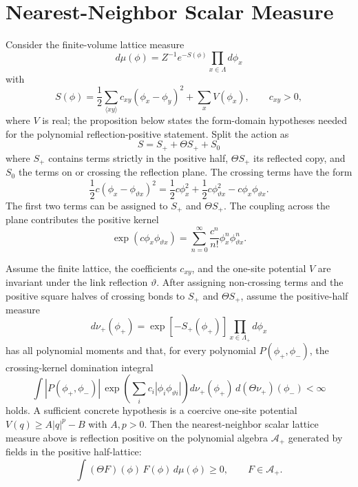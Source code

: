 \section{Nearest-Neighbor Scalar Measure}

Consider the finite-volume lattice measure
\[
  d\mu(\phi)=Z^{-1}e^{-S(\phi)}\prod_{x\in\Lambda}d\phi_x
\]
with
\[
  S(\phi)=
  \frac12\sum_{\langle x y\rangle}c_{xy}(\phi_x-\phi_y)^2
  +\sum_x V(\phi_x),
  \qquad c_{xy}>0,
\]
where \(V\) is real; the proposition below states the form-domain hypotheses
needed for the polynomial reflection-positive statement.
Split the action as
\[
  S=S_+ + \Theta S_+ + S_0
\]
where \(S_+\) contains terms strictly in the positive half, \(\Theta S_+\)
its reflected copy, and \(S_0\) the terms on or crossing the reflection
plane.  The crossing terms have the form
\[
  \frac12 c(\phi_x-\phi_{\vartheta x})^2
  =
  \frac12c\phi_x^2+\frac12c\phi_{\vartheta x}^2
  -c\phi_x\phi_{\vartheta x}.
\]
The first two terms can be assigned to \(S_+\) and \(\Theta S_+\).  The
coupling across the plane contributes the positive kernel
\[
  \exp(c\phi_x\phi_{\vartheta x})
  =
  \sum_{n=0}^{\infty}\frac{c^n}{n!}\phi_x^n\phi_{\vartheta x}^n .
\]

\begin{proposition}
\label{prop:scalar-lattice-reflection-positivity}
Assume the finite lattice, the coefficients \(c_{xy}\), and the one-site
potential \(V\) are invariant under the link reflection \(\vartheta\).  After
assigning non-crossing terms and the positive square halves of crossing bonds
to \(S_+\) and \(\Theta S_+\), assume the positive-half measure
\[
  d\nu_+(\phi_+)
  =
  \exp[-S_+(\phi_+)]
  \prod_{x\in\Lambda_+}d\phi_x
\]
has all polynomial moments and that, for every polynomial
\(P(\phi_+,\phi_-)\), the crossing-kernel domination integral
\[
  \int |P(\phi_+,\phi_-)|\,
  \exp\!\left(\sum_i c_i|\phi_i\phi_{\vartheta i}|\right)
  d\nu_+(\phi_+)\,d(\Theta\nu_+)(\phi_-)
  <\infty
\]
holds.  A sufficient concrete hypothesis is a coercive one-site potential
\(V(q)\ge A|q|^p-B\) with \(A,p>0\).  Then the nearest-neighbor scalar
lattice measure above is reflection positive on the polynomial algebra
\(\mathcal A_+\) generated by fields in the positive half-lattice:
\[
  \int (\Theta F)(\phi)\,F(\phi)\,d\mu(\phi)\geq0,
  \qquad F\in\mathcal A_+ .
\]
\end{proposition}

